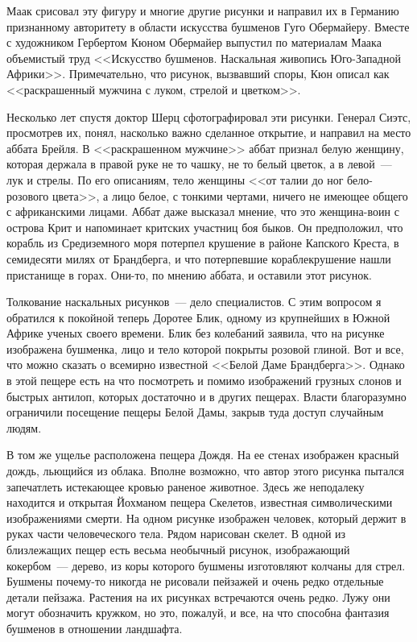 \documentclass[12pt,a4paper,twoside,openany,svgnames]{memoir}
\begin{document}
Маак срисовал эту фигуру и многие другие рисунки и направил их в Германию признанному авторитету в области искусства бушменов Гуго Обермайеру. Вместе с художником Гербертом Кюном Обермайер выпустил по материалам Маака объемистый труд <<Искусство бушменов. Наскальная живопись Юго-Западной Африки>>. Примечательно, что рисунок, вызвавший споры, Кюн описал как <<раскрашенный мужчина с луком, стрелой и цветком>>.

Несколько лет спустя доктор Шерц сфотографировал эти рисунки. Генерал Сиэтс, просмотрев их, понял, насколько важно сделанное открытие, и направил на место аббата Брейля. В <<раскрашенном мужчине>> аббат признал белую женщину, которая держала в правой руке не то чашку, не то белый цветок, а в левой~--- лук и стрелы. По его описаниям, тело женщины <<от талии до ног бело-розового цвета>>, а лицо белое, с тонкими чертами, ничего не имеющее общего с африканскими лицами. Аббат даже высказал мнение, что это женщина-воин с острова Крит и напоминает критских участниц боя быков. Он предположил, что корабль из Средиземного моря потерпел крушение в районе Капского Креста, в семидесяти милях от Брандберга, и что потерпевшие кораблекрушение нашли пристанище в горах. Они-то, по мнению аббата, и оставили этот рисунок.

Толкование наскальных рисунков~--- дело специалистов. С этим вопросом я обратился к покойной теперь Доротее Блик, одному из крупнейших в Южной Африке ученых своего времени. Блик без колебаний заявила, что на рисунке изображена бушменка, лицо и тело которой покрыты розовой глиной. Вот и все, что можно сказать о всемирно известной <<Белой Даме Брандберга>>. Однако в этой пещере есть на что посмотреть и помимо изображений грузных слонов и быстрых антилоп, которых достаточно и в других пещерах. Власти благоразумно ограничили посещение пещеры Белой Дамы, закрыв туда доступ случайным людям.

В том же ущелье расположена пещера Дождя. На ее стенах изображен красный дождь, льющийся из облака. Вполне возможно, что автор этого рисунка пытался запечатлеть истекающее кровью раненое животное. Здесь же неподалеку находится и открытая Йохманом пещера Скелетов, известная символическими изображениями смерти. На одном рисунке изображен человек, который держит в руках части человеческого тела. Рядом нарисован скелет. В одной из близлежащих пещер есть весьма необычный рисунок, изображающий кокербом~--- дерево, из коры которого бушмены изготовляют колчаны для стрел. Бушмены почему-то никогда не рисовали пейзажей и очень редко отдельные детали пейзажа. Растения на их рисунках встречаются очень редко. Лужу они могут обозначить кружком, но это, пожалуй, и все, на что способна фантазия бушменов в отношении ландшафта.
\end{document}
